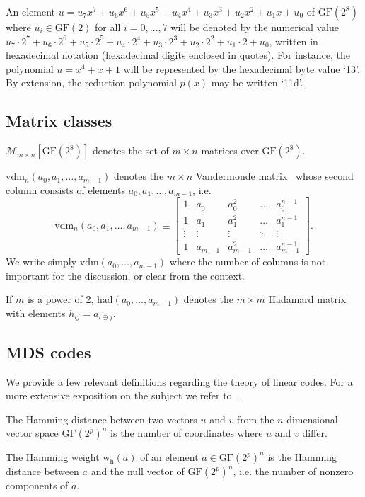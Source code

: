 \documentclass{llncs}
\newcommand{\GF}{\mathrm{GF}}
\newcommand{\vdm}{\mathrm{vdm}}
\newcommand{\had}{\mathrm{had}}
\newcommand{\matrices}[2]{\mathcal{M}_{#1 \times #2}[\GF(2^8)]}
\newcommand{\gf}[1]{\textsf{`#1'}}
\newcommand{\w}{\mathrm{w_h}}
\begin{document}
An element $u = u_7 x^7 + u_6 x^6 + u_5 x^5 + u_4 x^4 + u_3 x^3 +
u_2 x^2 + u_1 x + u_0$ of $\GF(2^8)$ where $u_i \in \GF(2)$ for
all $i = 0, \dots, 7$ will be denoted by the numerical value $u_7
\cdot 2^7 + u_6 \cdot 2^6 + u_5 \cdot 2^5 + u_4 \cdot 2^4 + u_3
\cdot 2^3 + u_2 \cdot 2^2 + u_1 \cdot 2 + u_0$, written in
hexadecimal notation (hexadecimal digits enclosed in quotes). For
instance, the polynomial $u = x^4 + x + 1$ will be represented by
the hexadecimal byte value \gf{13}. By extension, the reduction
polynomial $p(x)$ may be written \gf{11d}.

\subsection{Matrix classes}

$\matrices{m}{n}$ denotes the set of $m \times n$ matrices over
$\GF(2^8)$.

$\vdm_n(a_0, a_1, \dots, a_{m-1})$ denotes the $m \times n$
Vandermonde matrix~\cite{hoffman-kunze} whose second column
consists of elements $a_0, a_1, \dots, a_{m-1}$, i.e.
\[
\vdm_n(a_0, a_1, \dots, a_{m-1}) \equiv \left[\begin{array}{ccccc}
1 & a_0^{} & a_0^2 & \dots & a_0^{n-1} \\
1 & a_1^{} & a_1^2 & \dots & a_1^{n-1} \\
\vdots & \vdots & \vdots & \ddots & \vdots \\
1 & a_{m-1}^{} & a_{m-1}^2 & \dots & a_{m-1}^{n-1}
\end{array} \right].
\]
We write simply $\vdm(a_0, \dots, a_{m-1})$ where the number of
columns is not important for the discussion, or clear from the
context.

If $m$ is a power of 2, $\had(a_0, \dots, a_{m-1})$ denotes the
$m \times m$ Hadamard matrix~\cite{walsh} with elements $h_{ij} =
a_{i \oplus j}$.

\subsection{MDS codes}

We provide a few relevant definitions regarding the theory of
linear codes. For a more extensive exposition on the subject we
refer to~\cite{macwilliams-sloane}.

The Hamming distance between two vectors $u$ and $v$ from the
$n$-dimensional vector space $\GF(2^p)^n$ is the number of
coordinates where $u$ and $v$ differ.

The Hamming weight $\w(a)$ of an element $a \in \GF(2^p)^n$ is
the Hamming distance between $a$ and the null vector of
$\GF(2^p)^n$, i.e. the number of nonzero components of $a$.
\end{document}
